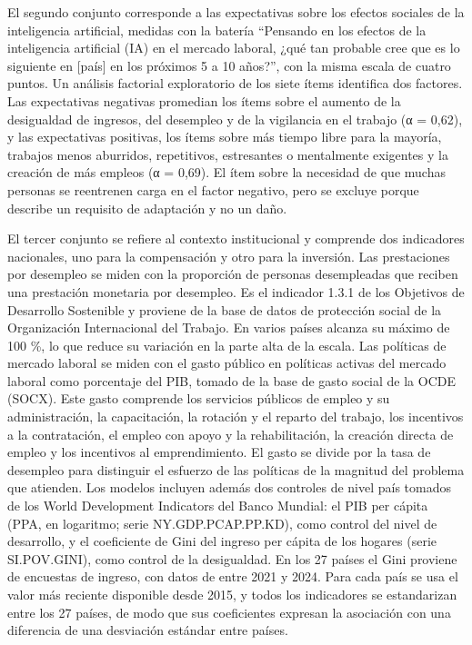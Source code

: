\documentclass[
  spanish,
  12pt,
]{article}
\begin{document}
El segundo conjunto corresponde a las expectativas sobre los efectos
sociales de la inteligencia artificial, medidas con la batería
``Pensando en los efectos de la inteligencia artificial (IA) en el
mercado laboral, ¿qué tan probable cree que es lo siguiente en
{[}país{]} en los próximos 5 a 10 años?'', con la misma escala de cuatro
puntos. Un análisis factorial exploratorio de los siete ítems identifica
dos factores. Las expectativas negativas promedian los ítems sobre el
aumento de la desigualdad de ingresos, del desempleo y de la vigilancia
en el trabajo (α = 0,62), y las expectativas positivas, los ítems sobre
más tiempo libre para la mayoría, trabajos menos aburridos, repetitivos,
estresantes o mentalmente exigentes y la creación de más empleos (α =
0,69). El ítem sobre la necesidad de que muchas personas se reentrenen
carga en el factor negativo, pero se excluye porque describe un
requisito de adaptación y no un daño.

El tercer conjunto se refiere al contexto institucional y comprende dos
indicadores nacionales, uno para la compensación y otro para la
inversión. Las prestaciones por desempleo se miden con la proporción de
personas desempleadas que reciben una prestación monetaria por
desempleo. Es el indicador 1.3.1 de los Objetivos de Desarrollo
Sostenible y proviene de la base de datos de protección social de la
Organización Internacional del Trabajo. En varios países alcanza su
máximo de 100 \%, lo que reduce su variación en la parte alta de la
escala. Las políticas de mercado laboral se miden con el gasto público
en políticas activas del mercado laboral como porcentaje del PIB, tomado
de la base de gasto social de la OCDE (SOCX). Este gasto comprende los
servicios públicos de empleo y su administración, la capacitación, la
rotación y el reparto del trabajo, los incentivos a la contratación, el
empleo con apoyo y la rehabilitación, la creación directa de empleo y
los incentivos al emprendimiento. El gasto se divide por la tasa de
desempleo para distinguir el esfuerzo de las políticas de la magnitud
del problema que atienden. Los modelos incluyen además dos controles de
nivel país tomados de los World Development Indicators del Banco
Mundial: el PIB per cápita (PPA, en logaritmo; serie NY.GDP.PCAP.PP.KD),
como control del nivel de desarrollo, y el coeficiente de Gini del
ingreso per cápita de los hogares (serie SI.POV.GINI), como control de
la desigualdad. En los 27 países el Gini proviene de encuestas de
ingreso, con datos de entre 2021 y 2024. Para cada país se usa el valor
más reciente disponible desde 2015, y todos los indicadores se
estandarizan entre los 27 países, de modo que sus coeficientes expresan
la asociación con una diferencia de una desviación estándar entre
países.
\end{document}
